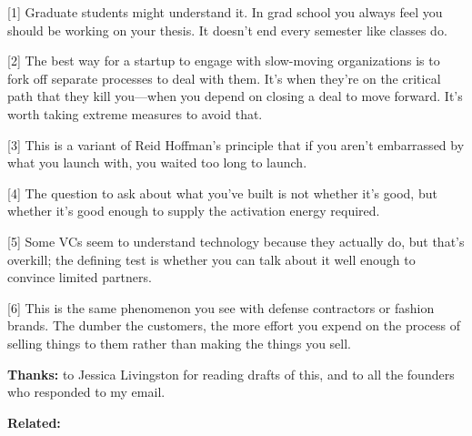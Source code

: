 {[}1{]} Graduate students might understand it. In grad school you always
feel you should be working on your thesis. It doesn't end every semester
like classes do.

{[}2{]} The best way for a startup to engage with slow-moving
organizations is to fork off separate processes to deal with them. It's
when they're on the critical path that they kill you---when you depend
on closing a deal to move forward. It's worth taking extreme measures to
avoid that.

{[}3{]} This is a variant of Reid Hoffman's principle that if you aren't
embarrassed by what you launch with, you waited too long to launch.

{[}4{]} The question to ask about what you've built is not whether it's
good, but whether it's good enough to supply the activation energy
required.

{[}5{]} Some VCs seem to understand technology because they actually do,
but that's overkill; the defining test is whether you can talk about it
well enough to convince limited partners.

{[}6{]} This is the same phenomenon you see with defense contractors or
fashion brands. The dumber the customers, the more effort you expend on
the process of selling things to them rather than making the things you
sell.

\textbf{Thanks:} to Jessica Livingston for reading drafts of this, and
to all the founders who responded to my email.

\textbf{Related:}
